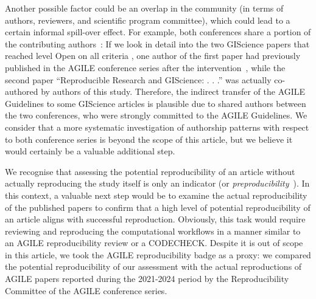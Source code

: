 \documentclass{josis}
\begin{document}
Another possible factor could be an overlap in the community (in terms of authors, reviewers, and scientific program committee), which could lead to a certain informal spill-over effect. 
For example, both conferences share a portion of the contributing authors~\cite{ostermann2021}:
If we look in detail into the two GIScience papers that reached level Open on all criteria \cite{ostermann2021,hildemann2023}, one author of the first paper had previously published in the AGILE conference series after the intervention~\cite{shi2023, Janowicz2022}, while the second paper ``Reproducible Research and GIScience: . . .'' was actually co-authored by authors of this study. Therefore, the indirect transfer of the AGILE Guidelines to some GIScience articles is plausible due to shared authors between the two conferences, who were strongly committed to the AGILE Guidelines. 
We consider that a more systematic investigation of authorship patterns with respect to both conference series is beyond the scope of this article, but we believe it would certainly be a valuable additional step. 

We recognise that assessing the potential reproducibility of an article without actually reproducing the study itself is only an indicator (or \textit{preproducibility}~\cite{stark2018before}). In this context, a valuable next step would be to examine the actual reproducibility of the published papers to confirm that a high level of potential reproducibility of an article aligns with successful reproduction. Obviously, this task would require reviewing and reproducing the computational workflows in a manner similar to an AGILE reproducibility review or a CODECHECK. Despite it is out of scope in this article, we took the AGILE reproducibility badge as a proxy: we compared the potential reproducibility of our assessment with the actual reproductions of AGILE papers reported during the 2021-2024 period by the Reproducibility Committee of the AGILE conference series. 
\end{document}
